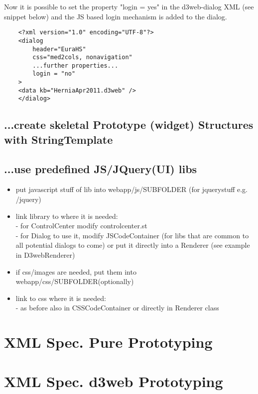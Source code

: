 \documentclass[a4paper,10pt]{scrreprt}
\begin{document}
Now it is possible to set the property "login = yes" in the d3web-dialog XML (see snippet below) and the JS based login mechanism is added to the dialog.
\begin{verbatim}
	<?xml version="1.0" encoding="UTF-8"?>
	<dialog 
	    header="EuraHS"  
	    css="med2cols, nonavigation" 
	    ...further properties...
	    login = "no"
	>
	<data kb="HerniaApr2011.d3web" />
	</dialog>
\end{verbatim}

\section{...create skeletal Prototype (widget) Structures with StringTemplate}

\section{...use predefined JS/JQuery(UI) libs}
\begin{itemize}
	\item put javascript stuff of lib into webapp/js/SUBFOLDER (for jquerystuff e.g. /jquery)
	\item link library to where it is needed:\\
	- for ControlCenter modify controlcenter.st\\
	- for Dialog to use it, modify JSCodeContainer (for libs that are common to all potential dialogs to come) or put
	it directly into a Renderer (see example in D3webRenderer)
	\item if css/images are needed, put them into webapp/css/SUBFOLDER(optionally)
	\item link to css where it is needed: \\
	- as before also in CSSCodeContainer or directly in Renderer class
\end{itemize}

\setcounter{secnumdepth}{1}
\appendix
{}

\chapter{XML Spec. Pure Prototyping}\label{appspecificationpp}

\chapter{XML Spec. d3web Prototyping}\label{appspecificationdp}
\end{document}
